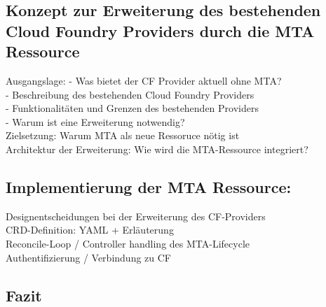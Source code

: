 \subsection{Konzept zur Erweiterung des bestehenden Cloud Foundry Providers durch die MTA Ressource}
Ausgangslage:
    - Was bietet der CF Provider aktuell ohne MTA? \\
    - Beschreibung des bestehenden Cloud Foundry Providers \\
    - Funktionalitäten und Grenzen des bestehenden Providers \\
    - Warum ist eine Erweiterung notwendig? \\
Zielsetzung: Warum MTA als neue Ressoruce nötig ist \\
Architektur der Erweiterung: Wie wird die MTA-Ressource integriert? \\

\subsection{Implementierung der MTA Ressource:}
Designentscheidungen bei der Erweiterung des CF-Providers \\
CRD-Definition: YAML + Erläuterung \\
Reconcile-Loop / Controller handling des MTA-Lifecycle \\
Authentifizierung / Verbindung zu CF

\subsection{Fazit}

